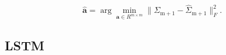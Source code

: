 \documentclass{article}
\begin{document}
\begin{equation}
    \hat{\mathbf{a}} = \arg\min\limits_{\mathbf{a} \in R^{m \times m}}\|\Sigma_{\text{m} + 1} - \hat{\Sigma}_{\text{m} + 1}\|_F^2.
\end{equation}

\subsection{LSTM}

\begin{comment}
    \subsection{Многомерная гусеница (MSSA)}

Пусть имеем реализацию матрицы попарных расстояний из \text{m} компонент: $\Sigma = [\Sigma_1, \Sigma_2, \ldots, \Sigma_\text{m}]$. Определим \textbf{L} - ширина окна, \text{K} $ = \textbf{m} - \text{L} + 1$. В силу того, что матрица симметричная, то для каждой компоненты матрицы попарных расстояний, где $i \leqslant j$, построим матрицу траекторий (матрица Ганкеля):

\begin{equation}
    \mathbf{H}_{ij} = \left(
\begin{array}{cccc}
d_1(\mathbf{x}^{(i)}, \mathbf{x}^{(j)}) & d_2(\mathbf{x}^{(i)}, \mathbf{x}^{(j)}) & \ldots & d_{\text{K}}(\mathbf{x}^{(i)}, \mathbf{x}^{(j)})\\
d_2(\mathbf{x}^{(i)}, \mathbf{x}^{(j)}) & d_3(\mathbf{x}^{(i)}, \mathbf{x}^{(j)}) & \ldots & d_{\text{K} + 1}(\mathbf{x}^{(i)}, \mathbf{x}^{(j)})\\
\vdots & \vdots & \ddots & \vdots\\
d_{\text{L}}(\mathbf{x}^{(i)}, \mathbf{x}^{(j)}) & d_{\text{L} + 1}(\mathbf{x}^{(i)}, \mathbf{x}^{(j)}) & \ldots & d_\text{m}(\mathbf{x}^{(i)}, \mathbf{x}^{(j)})\\
\end{array}
\right).
\end{equation}

Строим блочную матрицу траекторий:

\begin{equation}
    \mathbf{H} = [\mathbf{H}_{11} : \mathbf{H}_{12} : \mathbf{H}_{13} : \mathbf{H}_{1n} : \mathbf{H}_{22} : \ldots : \mathbf{H}_{nn}]
\end{equation}

Сингулярное разложение симметричной, положительно полуопределенной матрицы $\mathbf{H}\mathbf{H}^T = \mathbf{U}\Lambda\mathbf{U}^T$, где $\Lambda$ - диагональная матрица $\text{L} \times \text{L}$ собственных значений $\lambda_1 \geq \ldots \geq \lambda_{\text{L}}$, $\mathbf{U} = [\mathbf{u}_1, \ldots, \mathbf{u}_{\text{L}}]$ - ортогональная матрица собственных векторов матрицы $\mathbf{H}\mathbf{H}^T$. Пусть $d = \max\{i|\lambda_i > 0, i \in \{1, \ldots, \text{L}\}\}$. Тогда исходную матрицу траекторий можно представить в виде:


\end{comment}
\end{document}
